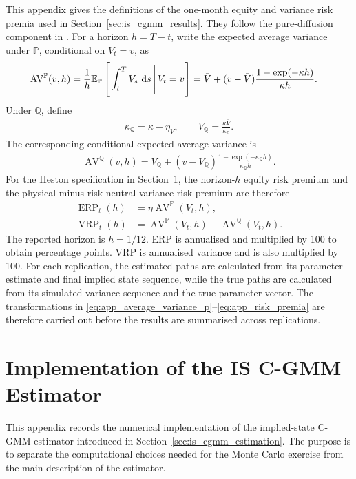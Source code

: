 \documentclass[11pt,a4paper,notitlepage]{article}
\numberwithin{equation}{section}
\begin{document}
This appendix gives the definitions of the one-month equity and variance risk premia used in Section~\ref{sec:is_cgmm_results}. They follow the pure-diffusion component in \citet{boswijk2015asset}. For a horizon $h=T-t$, write the expected average variance under $\mathbb P$, conditional on $V_t=v$, as
\begin{align}
\operatorname{AV}^{\mathbb P}(v,h)
&=
\frac{1}{h}\mathbb E_{\mathbb P}\left[\left.\int_t^T V_s\,\dif s\,\right|V_t=v\right]
=\bar V+(v-\bar V)\frac{1-\exp(-\kappa h)}{\kappa h}.
\label{eq:app_average_variance_p}
\end{align}
Under $\mathbb Q$, define
\begin{align}
\kappa_{\mathbb Q}=\kappa-\eta_V,
\qquad
\bar V_{\mathbb Q}=\frac{\kappa\bar V}{\kappa_{\mathbb Q}}.
\end{align}
The corresponding conditional expected average variance is
\begin{align}
\operatorname{AV}^{\mathbb Q}(v,h)
=\bar V_{\mathbb Q}+(v-\bar V_{\mathbb Q})
\frac{1-\exp(-\kappa_{\mathbb Q}h)}{\kappa_{\mathbb Q}h}.
\label{eq:app_average_variance_q}
\end{align}
For the Heston specification in Section~1, the horizon-$h$ equity risk premium and the physical-minus-risk-neutral variance risk premium are therefore
\begin{align}
\operatorname{ERP}_t(h)&=\eta\operatorname{AV}^{\mathbb P}(V_t,h),\\
\operatorname{VRP}_t(h)&=\operatorname{AV}^{\mathbb P}(V_t,h)-\operatorname{AV}^{\mathbb Q}(V_t,h).
\label{eq:app_risk_premia}
\end{align}
The reported horizon is $h=1/12$. ERP is annualised and multiplied by 100 to obtain percentage points. VRP is annualised variance and is also multiplied by 100. For each replication, the estimated paths are calculated from its parameter estimate and final implied state sequence, while the true paths are calculated from its simulated variance sequence and the true parameter vector. The transformations in \eqref{eq:app_average_variance_p}--\eqref{eq:app_risk_premia} are therefore carried out before the results are summarised across replications.

\section{Implementation of the IS C-GMM Estimator}
\label{app:is_cgmm_implementation}

This appendix records the numerical implementation of the implied-state C-GMM estimator introduced in Section~\ref{sec:is_cgmm_estimation}. The purpose is to separate the computational choices needed for the Monte Carlo exercise from the main description of the estimator.
\end{document}
